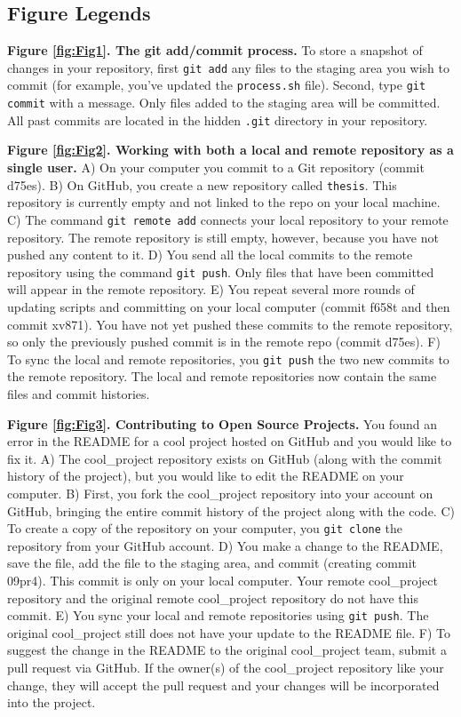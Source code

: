 \subsection{Figure Legends}

\textbf{Figure \ref{fig:Fig1}. The git add/commit process.}
To store a snapshot of changes in your repository, first \verb|git add| any files to the staging area you wish to commit (for example, you've updated the \verb|process.sh| file).
Second, type \verb|git commit| with a message. Only files added to the staging area will be committed.
All past commits are located in the hidden \verb|.git| directory in your repository.

\textbf{Figure \ref{fig:Fig2}. Working with both a local and remote repository as a single user.}
A) On your computer you commit to a Git repository (commit d75es).
B) On GitHub, you create a new repository called \verb|thesis|.
This repository is currently empty and not linked to the repo on your local machine.
C) The command \verb|git remote add| connects your local repository to your remote repository.
The remote repository is still empty, however, because you have not pushed any content to it.
D) You send all the local commits to the remote repository using the command \verb|git push|.
Only files that have been committed will appear in the remote repository.
E) You repeat several more rounds of updating scripts and committing on your local computer (commit f658t and then commit xv871).
You have not yet pushed these commits to the remote repository, so only the previously pushed commit is in the remote repo (commit d75es).
F) To sync the local and remote repositories, you \verb|git push| the two new commits to the remote repository.
The local and remote repositories now contain the same files and commit histories.

\textbf{Figure \ref{fig:Fig3}. Contributing to Open Source Projects.}
You found an error in the README for a cool project hosted on GitHub and you would like to fix it.
A) The cool\_project repository exists on GitHub (along with the commit history of the project), but you would like to edit the README on your computer.
B) First, you fork the cool\_project repository into your account on GitHub, bringing the entire commit history of the project along with the code.
C) To create a copy of the repository on your computer, you \verb|git clone| the repository from your GitHub account.
D) You make a change to the README, save the file, add the file to the staging area, and commit (creating commit 09pr4).
This commit is only on your local computer.
Your remote cool\_project repository and the original remote cool\_project repository do not have this commit.
E) You sync your local and remote repositories using \verb|git push|.
The original cool\_project still does not have your update to the README file.
F) To suggest the change in the README to the original cool\_project team, submit a pull request via GitHub.
If the owner(s) of the cool\_project repository like your change, they will accept the pull request and your changes will be incorporated into the project.

